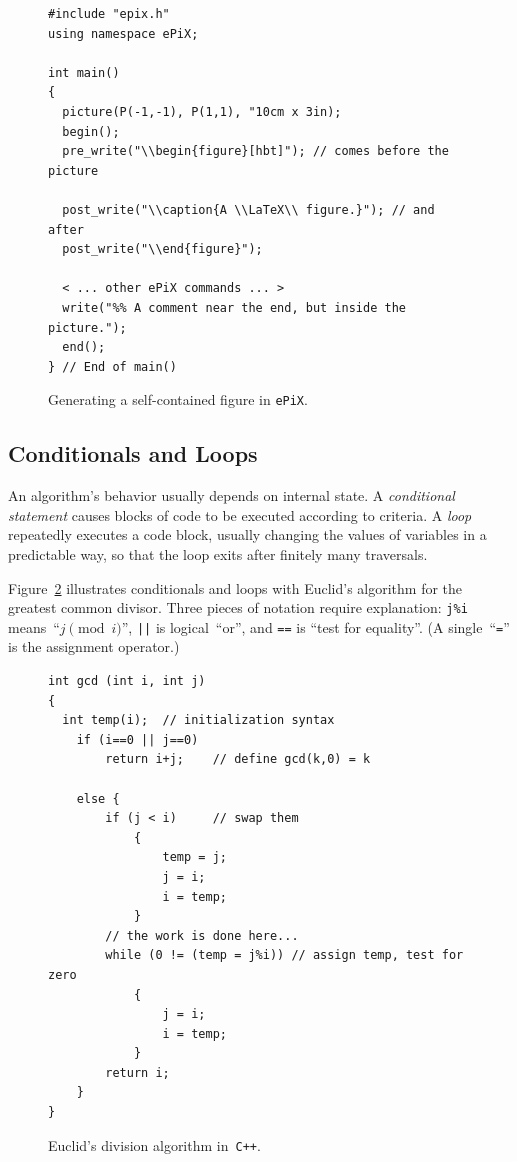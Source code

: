 \documentclass[12pt,letterpaper]{book}
\newcommand{\code}[1]{\texttt{#1}}
\newcommand{\ePiX}{\code{ePiX}}
\newcommand{\CXX}{\code{C++}}
\newcommand{\texicomment}{}
\newcommand{\texicommentend}{}
\newcommand{\teximath}[1]{$#1$}
\newcommand{\findex}[1]{\ignorespaces}
\begin{document}
\findex{pre\_write}
\findex{post\_write}
\findex{write}
\begin{figure}
\begin{footnotesize}
\begin{verbatim}
#include "epix.h"
using namespace ePiX;

int main()
{
  picture(P(-1,-1), P(1,1), "10cm x 3in);
  begin();
  pre_write("\\begin{figure}[hbt]"); // comes before the picture

  post_write("\\caption{A \\LaTeX\\ figure.}"); // and after
  post_write("\\end{figure}");

  < ... other ePiX commands ... >
  write("%% A comment near the end, but inside the picture.");
  end();
} // End of main()
\end{verbatim}
\end{footnotesize}
\caption{Generating a self-contained figure in \ePiX.}
\label{fig-captioned}
\end{figure}


\subsection{Conditionals and Loops}

An algorithm's behavior usually depends on internal state. A
\emph{conditional statement} causes blocks of code to be executed
according to criteria. A \emph{loop} repeatedly executes a code
block, usually changing the values of variables in a predictable way,
so that the loop exits after finitely many traversals.

\texicomment
Figure~\ref{fig-gcd} illustrates conditionals and loops with
Euclid's algorithm for the greatest common divisor. Three pieces of
notation require explanation: \code{j\%i} means~``\teximath{j\pmod i}'',
\code{||} is logical~``or'', and \code{==} is ``test for equality''.
(A single~``\code{=}'' is the assignment operator.)

\begin{figure}[hbt]
\begin{footnotesize}
\begin{verbatim}
int gcd (int i, int j)
{
  int temp(i);  // initialization syntax
    if (i==0 || j==0)
        return i+j;    // define gcd(k,0) = k

    else {
        if (j < i)     // swap them
            {
                temp = j;
                j = i;
                i = temp;
            }
        // the work is done here...
        while (0 != (temp = j%i)) // assign temp, test for zero
            {
                j = i;
                i = temp;
            }
        return i;
    }
}
\end{verbatim}
\end{footnotesize}
\caption{Euclid's division algorithm in~\CXX.}
\label{fig-gcd}
\end{figure}
\texicommentend
\end{document}
